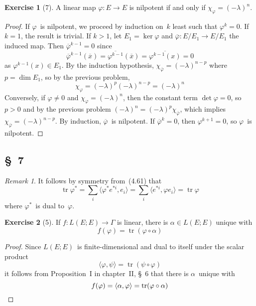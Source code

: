 \documentclass[letterpaper,12pt]{article}
\DeclareMathOperator{\tr}{tr}
\newcommand{\after}{\circ}
\newcommand{\sprod}[2]{\langle#1,#2\rangle}
\newcommand{\proj}[1]{\overline{#1}}
\theoremstyle{definition}
\newtheorem*{exer}{Exercise}
\theoremstyle{remark}
\newtheorem*{rmk}{Remark}
\begin{document}
\begin{exer}[7]
A linear map \(\varphi:E\to E\) is nilpotent if and only if \(\chi_{\varphi}=(-\lambda)^n\).
\end{exer}
\begin{proof}
If \(\varphi\)~is nilpotent, we proceed by induction on~\(k\) least such that \(\varphi^k=0\). If \(k=1\), the result is trivial. If \(k>1\), let \(E_1=\ker\varphi\) and \(\proj{\varphi}:E/E_1\to E/E_1\) the induced map. Then \(\proj{\varphi}^{k-1}=0\) since
\[\proj{\varphi}^{k-1}(\proj{x})=\proj{\varphi^{k-1}}(\proj{x})=\proj{\varphi^{k-1}(x)}=0\]
as \(\varphi^{k-1}(x)\in E_1\). By the induction hypothesis, \(\chi_{\proj{\varphi}}=(-\lambda)^{n-p}\) where \(p=\dim E_1\), so by the previous problem,
\[\chi_{\varphi}=(-\lambda)^p(-\lambda)^{n-p}=(-\lambda)^n\]
Conversely, if \(\varphi\ne0\) and \(\chi_{\varphi}=(-\lambda)^n\), then the constant term \(\det\varphi=0\), so \(p>0\) and by the previous problem \((-\lambda)^n=(-\lambda)^p\chi_{\proj{\varphi}}\), which implies \(\chi_{\proj{\varphi}}=(-\lambda)^{n-p}\). By induction, \(\proj{\varphi}\)~is nilpotent. If \(\proj{\varphi}^k=0\), then \(\varphi^{k+1}=0\), so \(\varphi\)~is nilpotent.
\end{proof}

\subsection*{\S~7}
\begin{rmk}
It follows by symmetry from~(4.61) that
\[\tr\varphi^*=\sum_i\sprod{\varphi^* e^{*i}}{e_i}=\sum_i\sprod{e^{*i}}{\varphi e_i}=\tr\varphi\]
where \(\varphi^*\)~is dual to~\(\varphi\).
\end{rmk}

\begin{exer}[5]
If \(f:L(E;E)\to\Gamma\) is linear, there is \(\alpha\in L(E;E)\) unique with
\[f(\varphi)=\tr(\varphi\after\alpha)\]
\end{exer}
\begin{proof}
Since \(L(E;E)\)~is finite-dimensional and dual to itself under the scalar product
\[\sprod{\varphi}{\psi}=\tr(\psi\after\varphi)\]
it follows from Proposition~I in chapter~II, \S~6 that there is \(\alpha\)~unique with
\[f(\varphi)=\sprod{\alpha}{\varphi}=\tr(\varphi\after\alpha)\qedhere\]
\end{proof}
\end{document}
